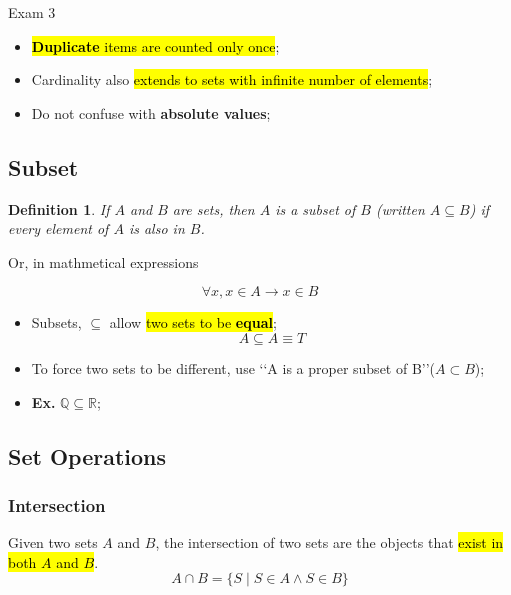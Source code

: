 \documentclass{note}
\newcommand{\intersect}{\cap}
\newtheorem{definition}{Definition}
\newcommand{\ex}{\textbf{Ex.} }
\begin{document}
\begin{note}{Exam 3}
        \begin{itemize}
            \item \hl{\textbf{Duplicate} items are counted only once};
            \item Cardinality also \hl{extends to sets with infinite number of elements};
            \item Do not confuse with \textbf{absolute values};
        \end{itemize}


        \subsection{Subset}

        \begin{definition}
            If $ A $ and $ B $ are sets, then $ A $ is a subset of $ B $ (written $ A \subseteq B $) if every element of
            $ A $ is also in $ B $.
        \end{definition}

        Or, in mathmetical expressions

        \begin{displaymath}
            \forall x, x \in A \to x \in B
        \end{displaymath}

        \begin{itemize}
            \item Subsets, $ \subseteq $ allow \hl{two sets to be \textbf{equal}};
            \begin{displaymath}
                A \subseteq A \equiv T
            \end{displaymath}
            \item To force two sets to be different, use \lq\lq A is a proper subset of B\rq\rq ($ A \subset B $);
            \item \ex $ \mathbb{Q} \subseteq \mathbb{R} $;
        \end{itemize}

        \subsection{Set Operations}

        \subsubsection{Intersection}
        Given two sets $ A $ and $ B $, the intersection of two sets are the objects that \hl{exist in both $ A $ and $ B $}.
        \begin{equation}\label{eq: intersection}
            A \intersect B = \{ S \mid S \in A \wedge S \in B \}
        \end{equation}


\end{note}
\end{document}
